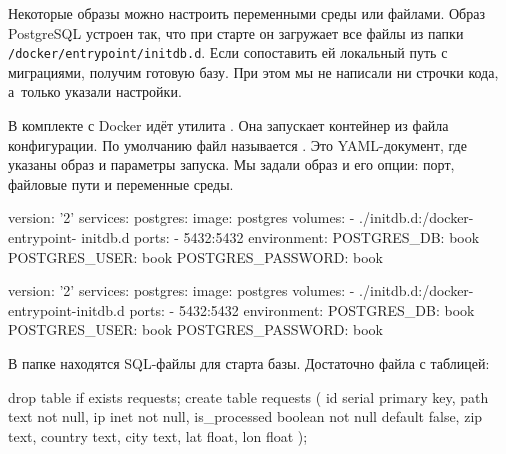 Некоторые образы можно настроить переменными среды или файлами. Образ PostgreSQL
устроен так, что при старте он загружает все  файлы из папки
\texttt{/docker\-/entrypoint\-/initdb.d}. Если сопоставить ей локальный путь с
миграциями, получим готовую базу. При этом мы не написали ни строчки кода,
а~только указали настройки.


В комплекте с Docker идёт утилита . Она запускает
контейнер из файла конфигурации. По умолчанию файл называется
. Это YAML-документ, где указаны образ и параметры
запуска. Мы задали образ  и его опции: порт, файловые пути и
переменные среды.


\ifnarrow

\begin{yaml}
version: '2'
services:
  postgres:
    image: postgres
    volumes:
      - ./initdb.d:/docker-entrypoint-
                                initdb.d
    ports:
      - 5432:5432
    environment:
      POSTGRES_DB: book
      POSTGRES_USER: book
      POSTGRES_PASSWORD: book
\end{yaml}

\else

\begin{yaml}
version: '2'
services:
  postgres:
    image: postgres
    volumes:
      - ./initdb.d:/docker-entrypoint-initdb.d
    ports:
      - 5432:5432
    environment:
      POSTGRES_DB: book
      POSTGRES_USER: book
      POSTGRES_PASSWORD: book
\end{yaml}

\fi

В папке  находятся SQL-файлы для старта базы. Достаточно файла
 с таблицей:


\ifnarrow

\begin{sql}
drop table if exists requests;
create table requests (
    id            serial primary key,
    path          text not null,
    ip            inet not null,
    is_processed  boolean not null
                  default false,
    zip           text,
    country       text,
    city          text,
    lat           float,
    lon           float
);
\end{sql}

\else

